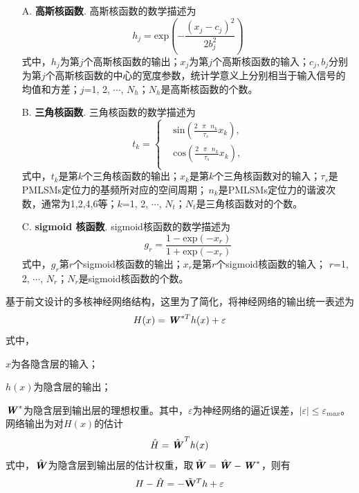 \begin{enumerate}
	\item[A.] \textbf{高斯核函数}. 高斯核函数的数学描述为
	\begin{equation}
	{{h}_{j}}=\text{exp}(-\frac{{{({{x}_{j}}-{{c}_{j}})}^{2}}}{2b_{j}^{2}})
	\end{equation}
	式中，$h_j$为第$j$个高斯核函数的输出；$x_j$为第$j$个高斯核函数的输入；$c_j$,\,$b_j$分别为第$j$个高斯核函数的中心的宽度参数，统计学意义上分别相当于输入信号的均值和方差；$j$=1, 2, $\cdots$, $N_h$；$N_h$是高斯核函数的个数。
	\item[B.] \textbf{三角核函数}. 三角核函数的数学描述为
	\begin{equation}
	{{t}_{k}}=\left\{ \begin{aligned}
	&\text{sin}(\frac{2\text{ }\!\!\pi\!\!\text{ }{{n}_{k}}}{{{\tau }_{s}}}{{x}_{k}})\text{,} \\ 
	&\text{cos}(\frac{2\text{ }\!\!\pi\!\!\text{ }{{n}_{k}}}{{{\tau }_{s}}}{{x}_{k}})\text{,} \\ 
	\end{aligned} \right.
	\end{equation}
	式中，$t_k$是第$k$个三角核函数的输出；$x_k$是第$k$个三角核函数对的输入；$\tau_s$是PMLSMs定位力的基频所对应的空间周期；\,$n_k$是PMLSMs定位力的谐波次数，通常为1,2,4,6等；$k$=1, 2, $\cdots$, $N_t$；$N_t$是三角核函数对的个数。
	\item[C.]\textbf{sigmoid 核函数}. sigmoid核函数的数学描述为
	\begin{equation}
	{{g}_{r}}=\frac{1-\text{exp}(-{{x}_{r}})}{1+\text{exp}(-{{x}_{r}})}
	\end{equation}
	式中，$g_r$第$r$个sigmoid核函数的输出；$x_r$是第$r$个sigmoid核函数的输入； $r$=1, 2, $\cdots$, $N_r$；$N_r$是sigmoid核函数的个数。
\end{enumerate}

基于前文设计的多核神经网络结构，这里为了简化，将神经网络的输出统一表述为
\begin{equation}
H(x)={\textbf{\textit{W}}^{*T}}h(x)+\varepsilon
\end{equation}
式中，

$x$为各隐含层的输入；

$h(x)$为隐含层的输出；

$\textbf{\textit{W}}^*$为隐含层到输出层的理想权重。其中，$\varepsilon$为神经网络的逼近误差，$\left|\varepsilon\right|\le\varepsilon_{max}$。网络输出为对$H(x)$的估计
\begin{equation}
\hat{H}={\hat{\textbf{\textit{W}}}}^{T}h(x)
\end{equation}
式中，$\hat{\textbf{\textit{W}}}$为隐含层到输出层的估计权重，取$\tilde{\textbf{\textit{\textbf{\textit{W}}}}}=\hat{\textbf{\textit{W}}}-\textbf{\textit{W}}^*$，则有
\begin{equation}
H-\hat{H}=-{{\tilde{\bf{W}}}^{T}}h+\varepsilon
\end{equation}
